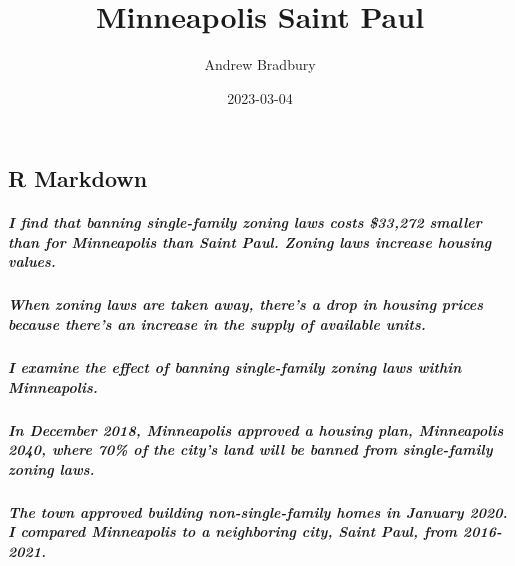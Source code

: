 \documentclass[
]{article}
\title{Minneapolis Saint Paul}
\author{Andrew Bradbury}
\date{2023-03-04}
\begin{document}
\maketitle

\hypertarget{r-markdown}{%
\subsection{R Markdown}\label{r-markdown}}

\hypertarget{i-find-that-banning-single-family-zoning-laws-costs-33272-smaller-than-for-minneapolis-than-saint-paul.-zoning-laws-increase-housing-values.}{%
\subparagraph{I find that banning single-family zoning laws costs
\$33,272 smaller than for Minneapolis than Saint Paul. Zoning laws
increase housing
values.}\label{i-find-that-banning-single-family-zoning-laws-costs-33272-smaller-than-for-minneapolis-than-saint-paul.-zoning-laws-increase-housing-values.}}

\hypertarget{when-zoning-laws-are-taken-away-theres-a-drop-in-housing-prices-because-theres-an-increase-in-the-supply-of-available-units.}{%
\subparagraph{When zoning laws are taken away, there's a drop in housing
prices because there's an increase in the supply of available
units.}\label{when-zoning-laws-are-taken-away-theres-a-drop-in-housing-prices-because-theres-an-increase-in-the-supply-of-available-units.}}

\hypertarget{i-examine-the-effect-of-banning-single-family-zoning-laws-within-minneapolis.}{%
\subparagraph{I examine the effect of banning single-family zoning laws
within
Minneapolis.}\label{i-examine-the-effect-of-banning-single-family-zoning-laws-within-minneapolis.}}

\hypertarget{in-december-2018-minneapolis-approved-a-housing-plan-minneapolis-2040-where-70-of-the-citys-land-will-be-banned-from-single-family-zoning-laws.}{%
\subparagraph{In December 2018, Minneapolis approved a housing plan,
Minneapolis 2040, where 70\% of the city's land will be banned from
single-family zoning
laws.}\label{in-december-2018-minneapolis-approved-a-housing-plan-minneapolis-2040-where-70-of-the-citys-land-will-be-banned-from-single-family-zoning-laws.}}

\hypertarget{the-town-approved-building-non-single-family-homes-in-january-2020.-i-compared-minneapolis-to-a-neighboring-city-saint-paul-from-2016-2021.}{%
\subparagraph{The town approved building non-single-family homes in
January 2020. I compared Minneapolis to a neighboring city, Saint Paul,
from
2016-2021.}\label{the-town-approved-building-non-single-family-homes-in-january-2020.-i-compared-minneapolis-to-a-neighboring-city-saint-paul-from-2016-2021.}}
\end{document}
